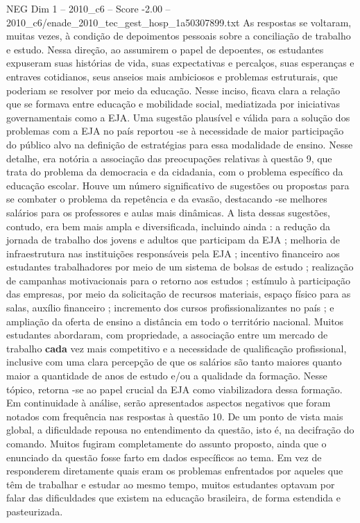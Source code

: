 \begin{textsample}{NEG Dim 1 – 2010\_c6 – Score -2.00 – 2010\_c6/enade\_2010\_tec\_gest\_hosp\_1a50307899.txt}
As respostas se voltaram, muitas vezes, à condição de depoimentos pessoais sobre a conciliação de trabalho e estudo.
Nessa direção, ao assumirem o papel de depoentes, os estudantes expuseram suas histórias de vida, suas expectativas e percalços, suas esperanças e entraves cotidianos, seus anseios mais ambiciosos e problemas estruturais, que poderiam se resolver por meio da educação.
Nesse inciso, ficava clara a relação que se formava entre educação e mobilidade social, mediatizada por iniciativas governamentais como a EJA.
Uma sugestão plausível e válida para a solução dos problemas com a EJA no país reportou -se à necessidade de maior participação do público alvo na definição de estratégias para essa modalidade de ensino.
Nesse detalhe, era notória a associação das preocupações relativas à questão 9, que trata do problema da democracia e da cidadania, com o problema específico da educação escolar.
Houve um número significativo de sugestões ou propostas para se combater o problema da repetência e da evasão, destacando -se melhores salários para os professores e aulas mais dinâmicas.
A lista dessas sugestões, contudo, era bem mais ampla e diversificada, incluindo ainda : a redução da jornada de trabalho dos jovens e adultos que participam da EJA ; melhoria de infraestrutura nas instituições responsáveis pela EJA ; incentivo financeiro aos estudantes trabalhadores por meio de um sistema de bolsas de estudo ; realização de campanhas motivacionais para o retorno aos estudos ; estímulo à participação das empresas, por meio da solicitação de recursos materiais, espaço físico para as salas, auxílio financeiro ; incremento dos cursos profissionalizantes no país ; e ampliação da oferta de ensino a distância em todo o território nacional.
Muitos estudantes abordaram, com propriedade, a associação entre um mercado de trabalho \textbf{cada} vez mais competitivo e a necessidade de qualificação profissional, inclusive com uma clara percepção de que os salários são tanto maiores quanto maior a quantidade de anos de estudo e/ou a qualidade da formação.
Nesse tópico, retorna -se ao papel crucial da EJA como viabilizadora dessa formação.
Em continuidade à análise, serão apresentados aspectos negativos que foram notados com frequência nas respostas à questão 10.
De um ponto de vista mais global, a dificuldade repousa no entendimento da questão, isto é, na decifração do comando.
Muitos fugiram completamente do assunto proposto, ainda que o enunciado da questão fosse farto em dados específicos ao tema.
Em vez de responderem diretamente quais eram os problemas enfrentados por aqueles que têm de trabalhar e estudar ao mesmo tempo, muitos estudantes optavam por falar das dificuldades que existem na educação brasileira, de forma estendida e pasteurizada.

\end{textsample}
